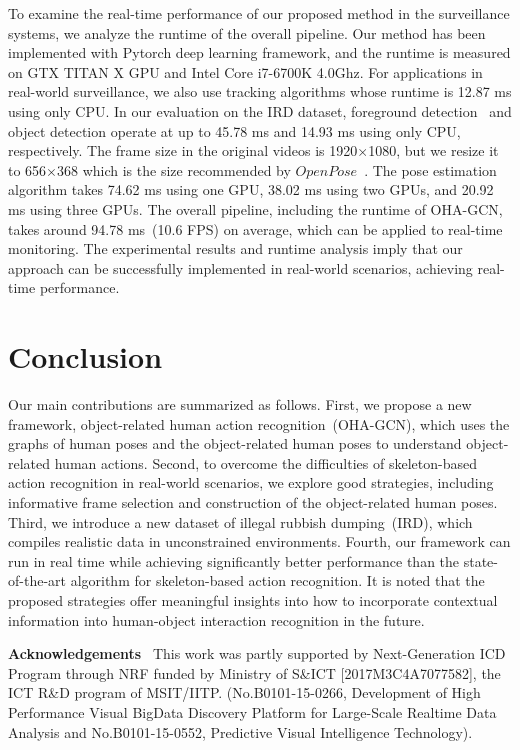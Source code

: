 \documentclass[10pt,twocolumn,letterpaper]{article}
\begin{document}
To examine the real-time performance of our proposed method in the surveillance systems, we analyze the runtime of the overall pipeline.
Our method has been implemented with Pytorch deep learning framework, and the runtime is measured on GTX TITAN X GPU and Intel Core i7-6700K 4.0Ghz.
For applications in real-world surveillance, we also use tracking algorithms whose runtime is 12.87 ms using only CPU. In our evaluation on the IRD dataset, foreground detection~\cite{cao2017realtime} and object detection operate at up to 45.78 ms and 14.93 ms using only CPU, respectively.
The frame size in the original videos is 1920$\times$1080, but we resize it to 656$\times$368 which is the size recommended by $OpenPose$~\cite{cao2017realtime}.
The pose estimation algorithm takes 74.62 ms using one GPU, 38.02 ms using two GPUs, and 20.92 ms using three GPUs.
The overall pipeline, including the runtime of OHA-GCN, takes around 94.78 ms~(10.6 FPS) on average, which can be applied to real-time monitoring.
The experimental results and runtime analysis imply that our approach can be successfully implemented in real-world scenarios, achieving real-time performance.


\section{Conclusion}
Our main contributions are summarized as follows. 
First, we propose a new framework, object-related human action recognition~(OHA-GCN), which uses the graphs of human poses and the object-related human poses to understand object-related human actions.
Second, to overcome the difficulties of skeleton-based action recognition in real-world scenarios, we explore good strategies, including informative frame selection and construction of the object-related human poses. 
Third, we introduce a new dataset of illegal rubbish dumping~(IRD), which compiles realistic data in unconstrained environments. 
Fourth, our framework can run in real time while achieving significantly better performance than the state-of-the-art algorithm for skeleton-based action recognition.
It is noted that the proposed strategies offer meaningful insights into how to incorporate contextual information into human-object interaction recognition in the future.



\vspace{2mm}
\noindent\textbf{Acknowledgements}
\ This work was partly supported by  
Next-Generation ICD Program through NRF funded by Ministry of S\&ICT [2017M3C4A7077582], 
the ICT R\&D program of MSIT/IITP. (No.B0101-15-0266, Development of High Performance Visual BigData Discovery Platform for Large-Scale Realtime Data Analysis and No.B0101-15-0552, Predictive Visual Intelligence Technology).
\normalsize

{\small


}
\end{document}

